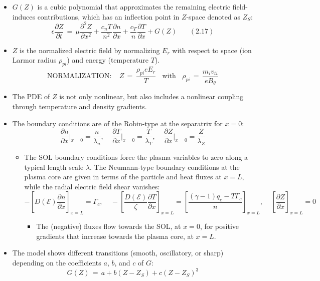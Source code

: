 \documentclass[]{article}
\providecommand{\tightlist}{%
  \setlength{\itemsep}{0pt}\setlength{\parskip}{0pt}}
\begin{document}
\begin{itemize}
  \begin{itemize}
  \item
    \(G(Z)\) is a cubic polynomial that approximates the remaining
    electric field-induces contributions, which has an inflection point
    in \(Z\)-space denoted as \(Z_S\):
    \[\epsilon \frac{\partial Z}{\partial t} \,=\, \mu \frac{\partial^2 Z}{\partial x^2} + \frac{c_n T}{n^2} \frac{\partial n}{\partial x} + \frac{c_T}{n} \frac{\partial T}{\partial x} + G(Z) ~~~~~~~~ (2.17)\]
  \item
    \(Z\) is the normalized electric field by normalizing \(E_r\) with
    respect to space (ion Larmor radius \(\rho_{pi}\)) and energy
    (temperature \(T\)).
    \[\text{NORMALIZATION:} ~~~~~ Z \,=\, \frac{\rho_{pi} e E_r}{T} ~~~~\text{with}~~~~ \rho_{pi} \,=\, \frac{m_i v_{ti}}{e B_\theta}\]
  \item
    The PDE of \(Z\) is not only nonlinear, but also includes a
    nonlinear coupling through temperature and density gradients.
  \item
    The boundary conditions are of the Robin-type at the separatrix for
    \(x = 0\):
    \[\frac{\partial n}{\partial x}\biggr\rvert_{x = 0} = \frac{n}{\lambda_n}, ~~~~~ \frac{\partial T}{\partial x}\biggr\rvert_{x = 0} = \frac{T}{\lambda_T}, ~~~~~ \frac{\partial Z}{\partial x}\biggr\rvert_{x = 0} = \frac{Z}{\lambda_Z}\]

    \begin{itemize}
    \item
      The SOL boundary conditions force the plasma variables to zero
      along a typical length scale \(\lambda\). The Neumann-type
      boundary conditions at the plasma core are given in terms of the
      particle and heat fluxes at \(x = L\), while the radial electric
      field shear vanishes:
      \[-\left[D(\mathcal{E}) \frac{\partial n}{\partial x}\right]_{x = L} = \Gamma_c, ~~~~~ -\left[\frac{D(\mathcal{E})}{\zeta} \frac{\partial T}{\partial x}\right]_{x = L} = \left[\frac{(\gamma - 1) q_c - T \Gamma_c}{n}\right]_{x = L}, ~~~~~ \left[\frac{\partial Z}{\partial x}\right]_{x = L} = 0\]

      \begin{itemize}
      \tightlist
      \item
        The (negative) fluxes flow towards the SOL, at \(x = 0\), for
        positive gradients that increase towards the plasma core, at
        \(x = L\).
      \end{itemize}
    \end{itemize}
  \item
    The model shows different transitions (smooth, oscillatory, or
    sharp) depending on the coefficients \(a\), \(b\), and \(c\) of
    \(G\): \[G(Z) \,=\, a + b(Z - Z_S) + c(Z - Z_S)^3\]
  \end{itemize}
\end{itemize}
\end{document}
